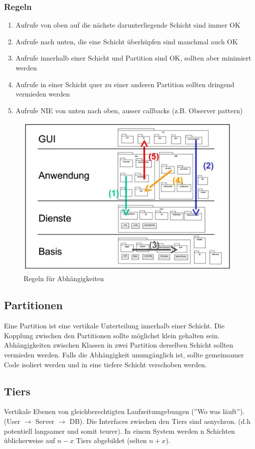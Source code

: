\subsubsection{Regeln}
\begin{enumerate}
	\item Aufrufe von oben auf die nächste darunterliegende Schicht sind immer OK
	\item Aufrufe nach unten, die eine Schicht überhüpfen sind manchmal auch OK
	\item Aufrufe innerhalb einer Schicht und Partition sind OK, sollten aber minimiert werden
	\item Aufrufe in einer Schicht quer zu einer anderen Partition sollten dringend vermieden werden
	\item Aufrufe NIE von unten nach oben, ausser callbacks (z.B. Observer pattern)
\end{enumerate}
\begin{figure}[h]
\centering
\includegraphics[width=0.6\linewidth]{images/dependency_rules}
\caption{Regeln für Abhängigkeiten}
\label{fig:dependencyrules}
\end{figure}

\subsection{Partitionen}
Eine Partition ist eine vertikale Unterteilung innerhalb einer Schicht. Die Kopplung zwischen den Partitionen sollte möglichst klein gehalten sein. Abhängigkeiten zwischen Klassen in zwei Partition derselben Schicht sollten vermieden werden. Falls die Abhängigkeit unumgänglich ist, sollte gemeinsamer Code isoliert werden und in eine tiefere Schicht verschoben werden. 

\subsection{Tiers}
Vertikale Ebenen von gleichberechtigten Laufzeitumgebungen (''Wo was läuft''). (User $\rightarrow$ Server $\rightarrow$ DB). Die Interfaces zwischen den Tiers sind asnychron. (d.h potentiell langsamer und somit teurer). In einem System werden n Schichten üblicherweise auf $n - x$ Tiers abgebildet (selten $n + x$). 



